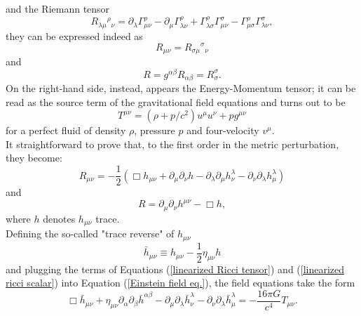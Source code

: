 \documentclass[12pt,twoside,openany]{book}
\begin{document}
and the Riemann tensor
\begin{equation}\label{Riemmann tensor def}
    R_{\lambda\mu}{}^{\rho}{}_{\nu}=\partial_\lambda \Gamma_{\mu\nu}^\rho-\partial_\mu \Gamma_{\lambda\nu}^\rho+\Gamma_{\lambda\sigma}^\rho \Gamma_{\mu\nu}^\sigma-\Gamma_{\mu\sigma}^\rho \Gamma_{\lambda\nu}^\sigma,
\end{equation}
they can be expressed indeed as 
\begin{equation}\label{Ricci tensor def}
    R_{\mu\nu}=R_{\sigma\mu}{}^{\sigma}{}_{\nu}
\end{equation}
and 
\begin{equation}\label{Ricci scalar def} R=g^{\alpha\beta}R_{\alpha\beta}=R_\sigma^\sigma.
\end{equation}
On the right-hand side, instead, appears the Energy-Momentum tensor; it can be read as the source term of the gravitational field equations and turns out to be
\begin{equation}\label{Energy-Momentum tensor def}
    T^{\mu\nu}=(\rho+p/c^2)u^\mu u^\nu+pg^{\mu\nu}
\end{equation}
for a perfect fluid of density $\rho$, pressure $p$ and four-velocity $v^\mu$.\\It straightforward to prove that, to the first order in the metric perturbation, they become:
\begin{equation}\label{linearized Ricci tensor}
    R_{\mu \nu}=-\frac{1}{2}(\Box h_{\mu \nu}+\partial_\mu \partial_\nu h-\partial_\lambda\partial_\mu h_\nu^\lambda-\partial_\nu\partial_\lambda h_\mu^\lambda)
\end{equation}
 and
\begin{equation}\label{linearized ricci scalar}
    R=\partial_\mu \partial_\nu h^{\mu\nu}-\Box h,
\end{equation}
where $h$ denotes $h_{\mu \nu}$ trace.\\Defining the so-called "trace reverse" of $h_{\mu\nu}$
\begin{equation}\label{trace reverse definition}
    \bar{h}_{\mu\nu}\equiv h_{\mu\nu}-\frac{1}{2}\eta_{\mu\nu} h
\end{equation}
and plugging the terms of Equations (\ref{linearized Ricci tensor}) and (\ref{linearized ricci scalar}) into Equation (\ref{Einstein field eq.}), the field equations take the form
\begin{equation}\label{linearized Einstein Eq. LONG}
    \Box \bar{h}_{\mu\nu} + \eta_{\mu\nu}\partial_\alpha\partial_\beta \bar{h}^{\alpha\beta}-\partial_\mu\partial_\lambda \bar{h}^\lambda_\nu-\partial_\nu\partial_\lambda \bar{h}^\lambda_\mu=-\frac{16\pi G}{c^4}T_{\mu\nu}.
\end{equation}
\end{document}
